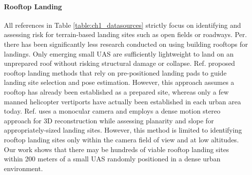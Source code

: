 \paragraph{Rooftop Landing}

All references in Table \ref{table:ch1_datasources} strictly focus on identifying and assessing risk for terrain-based landing sites such as open fields or roadways. Per. \cite{jin_-board_2016} there has been significantly less research conducted on using building rooftops for landings. Only emerging small UAS are sufficiently lightweight to land on an unprepared roof without risking structural damage or collapse. Ref. \cite{li_development_2015} proposed rooftop landing methods that rely on pre-positioned landing pads to guide landing site selection and pose estimation. However, this approach assumes a rooftop has already been established as a prepared site, whereas only a few manned helicopter vertiports have actually been established in each urban area today. Ref. \cite{desaraju_vision-based_2015}  uses a monocular camera and employs a dense motion stereo approach for 3D reconstruction while assessing planarity and slope for appropriately-sized landing sites. However, this method is limited to identifying rooftop landing sites only within the camera field of view and at low altitudes. Our work shows that there may be hundreds of viable rooftop landing sites within 200 meters of a small \ac{UAS} randomly positioned in a dense urban environment.







